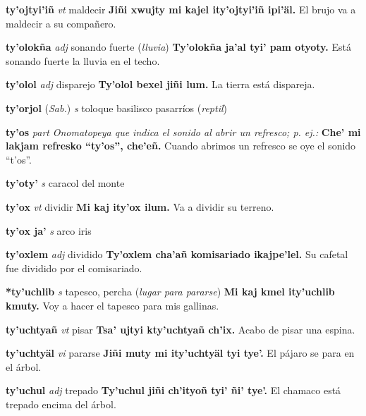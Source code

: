 \documentclass[10pt]{scrbook}
\newcommand{\entry}[1]{\textbf{#1}}
\newcommand{\nontranslationdef}[1]{\textit{#1}}
\newcommand{\partofspeech}[1]{\textit{#1}}
\newcommand{\spanishtranslation}[1]{#1}
\newcommand{\clarification}[1]{(\textit{#1})}
\newcommand{\cholexample}[1]{\textbf{#1}}
\newcommand{\exampletranslation}[1]{#1}
\newcommand{\relevantdialect}[1]{(\textit{#1})}
\begin{document}
\begin{multicols}{2}
\entry{ty'ojtyi'iñ}
\partofspeech{vt}
\spanishtranslation{maldecir}
\cholexample{Jiñi xwujty mi kajel ity'ojtyi'iñ ipi'äl.}
\exampletranslation{El brujo va a maldecir a su compañero.}

\entry{ty'olokña}
\partofspeech{adj}
\spanishtranslation{sonando fuerte}
\clarification{lluvia}
\cholexample{Ty'olokña ja'al tyi' pam otyoty.}
\exampletranslation{Está sonando fuerte la lluvia en el techo.}

\entry{ty'olol}
\partofspeech{adj}
\spanishtranslation{disparejo}
\cholexample{Ty'olol bexel jiñi lum.}
\exampletranslation{La tierra está dispareja.}

\entry{ty'orjol}
\relevantdialect{Sab.}
\partofspeech{s}
\spanishtranslation{toloque}
\spanishtranslation{basilisco}
\spanishtranslation{pasarríos}
\clarification{reptil}

\entry{ty'os}
\partofspeech{part}
\nontranslationdef{Onomatopeya que indica el sonido al abrir un refresco; p. ej.:}
\cholexample{Che' mi lakjam refresko “ty'os”, che'eñ.}
\exampletranslation{Cuando abrimos un refresco se oye el sonido “t'os”.}

\entry{ty'oty'}
\partofspeech{s}
\spanishtranslation{caracol del monte}

\entry{ty'ox}
\partofspeech{vt}
\spanishtranslation{dividir}
\cholexample{Mi kaj ity'ox ilum.}
\exampletranslation{Va a dividir su terreno.}

\entry{ty'ox ja'}
\partofspeech{s}
\spanishtranslation{arco iris}

\entry{ty'oxlem}
\partofspeech{adj}
\spanishtranslation{dividido}
\cholexample{Ty'oxlem cha'añ komisariado ikajpe'lel.}
\exampletranslation{Su cafetal fue dividido por el comisariado.}

\entry{*ty'uchlib}
\partofspeech{s}
\spanishtranslation{tapesco, percha}
\clarification{lugar para pararse}
\cholexample{Mi kaj kmel ity'uchlib kmuty.}
\exampletranslation{Voy a hacer el tapesco para mis gallinas.}

\entry{ty'uchtyañ}
\partofspeech{vt}
\spanishtranslation{pisar}
\cholexample{Tsa' ujtyi kty'uchtyañ ch'ix.}
\exampletranslation{Acabo de pisar una espina.}

\entry{ty'uchtyäl}
\partofspeech{vi}
\spanishtranslation{pararse}
\cholexample{Jiñi muty mi ity'uchtyäl tyi tye'.}
\exampletranslation{El pájaro se para en el árbol.}

\entry{ty'uchul}
\partofspeech{adj}
\spanishtranslation{trepado}
\cholexample{Ty'uchul jiñi ch'ityoñ tyi' ñi' tye'.}
\exampletranslation{El chamaco está trepado encima del árbol.}


\end{multicols}
\end{document}
